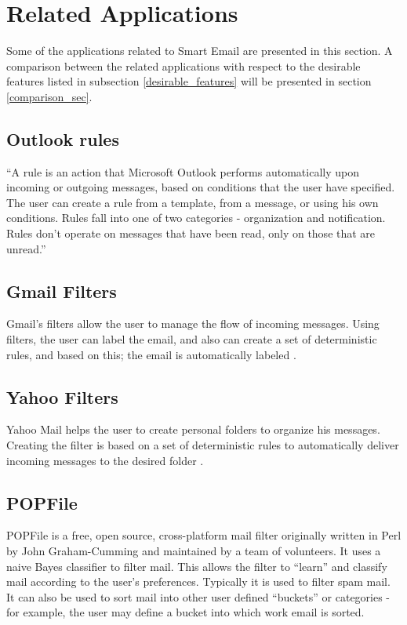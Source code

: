 \section{Related Applications}
\label{sec:related_apps}
Some of the applications related to Smart Email are presented in this section. A comparison between the related applications with respect to the desirable features listed in subsection \ref{desirable_features} will be presented in section \ref{comparison_sec}.

\subsection{Outlook rules}
``A rule is an action that Microsoft Outlook performs automatically upon incoming or outgoing 
messages, based on conditions that the user have specified. The user can create a rule 
from a template, from a message, or using his own conditions. Rules fall into one of 
two categories - organization and notification. Rules don't operate on messages that 
have been read, only on those that are unread.'' \cite{OUTLOOK_REF}

\subsection{Gmail Filters}
Gmail's filters allow the user to manage the flow of incoming messages. Using filters, 
the user can label the email, and also can create a set of deterministic rules, and 
based on this; the email is automatically labeled \cite{GMAIL_FILTERS}.

\subsection{Yahoo Filters}
Yahoo Mail helps the user to create personal folders to organize his messages. 
Creating the filter is based on a set of deterministic rules to automatically deliver 
incoming messages to the desired folder \cite{YAHOO_FILTERS}.

\subsection{POPFile}
POPFile is a free, open source, cross-platform mail filter originally written in 
Perl by John Graham-Cumming and maintained by a team of volunteers. It uses a 
naive Bayes classifier to filter mail. This allows the filter to ``learn'' and 
classify mail according to the user's preferences. Typically it is used to filter 
spam mail. It can also be used to sort mail into other user defined ``buckets'' 
or categories - for example, the user may define a bucket into which work email 
is sorted.

